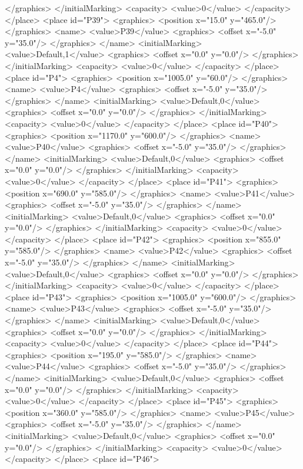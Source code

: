 </graphics>
</initialMarking>
<capacity>
<value>0</value>
</capacity>
</place>
<place id="P39">
<graphics>
<position x="15.0" y="465.0"/>
</graphics>
<name>
<value>P39</value>
<graphics>
<offset x="-5.0" y="35.0"/>
</graphics>
</name>
<initialMarking>
<value>Default,1</value>
<graphics>
<offset x="0.0" y="0.0"/>
</graphics>
</initialMarking>
<capacity>
<value>0</value>
</capacity>
</place>
<place id="P4">
<graphics>
<position x="1005.0" y="60.0"/>
</graphics>
<name>
<value>P4</value>
<graphics>
<offset x="-5.0" y="35.0"/>
</graphics>
</name>
<initialMarking>
<value>Default,0</value>
<graphics>
<offset x="0.0" y="0.0"/>
</graphics>
</initialMarking>
<capacity>
<value>0</value>
</capacity>
</place>
<place id="P40">
<graphics>
<position x="1170.0" y="600.0"/>
</graphics>
<name>
<value>P40</value>
<graphics>
<offset x="-5.0" y="35.0"/>
</graphics>
</name>
<initialMarking>
<value>Default,0</value>
<graphics>
<offset x="0.0" y="0.0"/>
</graphics>
</initialMarking>
<capacity>
<value>0</value>
</capacity>
</place>
<place id="P41">
<graphics>
<position x="690.0" y="585.0"/>
</graphics>
<name>
<value>P41</value>
<graphics>
<offset x="-5.0" y="35.0"/>
</graphics>
</name>
<initialMarking>
<value>Default,0</value>
<graphics>
<offset x="0.0" y="0.0"/>
</graphics>
</initialMarking>
<capacity>
<value>0</value>
</capacity>
</place>
<place id="P42">
<graphics>
<position x="855.0" y="585.0"/>
</graphics>
<name>
<value>P42</value>
<graphics>
<offset x="-5.0" y="35.0"/>
</graphics>
</name>
<initialMarking>
<value>Default,0</value>
<graphics>
<offset x="0.0" y="0.0"/>
</graphics>
</initialMarking>
<capacity>
<value>0</value>
</capacity>
</place>
<place id="P43">
<graphics>
<position x="1005.0" y="600.0"/>
</graphics>
<name>
<value>P43</value>
<graphics>
<offset x="-5.0" y="35.0"/>
</graphics>
</name>
<initialMarking>
<value>Default,0</value>
<graphics>
<offset x="0.0" y="0.0"/>
</graphics>
</initialMarking>
<capacity>
<value>0</value>
</capacity>
</place>
<place id="P44">
<graphics>
<position x="195.0" y="585.0"/>
</graphics>
<name>
<value>P44</value>
<graphics>
<offset x="-5.0" y="35.0"/>
</graphics>
</name>
<initialMarking>
<value>Default,0</value>
<graphics>
<offset x="0.0" y="0.0"/>
</graphics>
</initialMarking>
<capacity>
<value>0</value>
</capacity>
</place>
<place id="P45">
<graphics>
<position x="360.0" y="585.0"/>
</graphics>
<name>
<value>P45</value>
<graphics>
<offset x="-5.0" y="35.0"/>
</graphics>
</name>
<initialMarking>
<value>Default,0</value>
<graphics>
<offset x="0.0" y="0.0"/>
</graphics>
</initialMarking>
<capacity>
<value>0</value>
</capacity>
</place>
<place id="P46">
